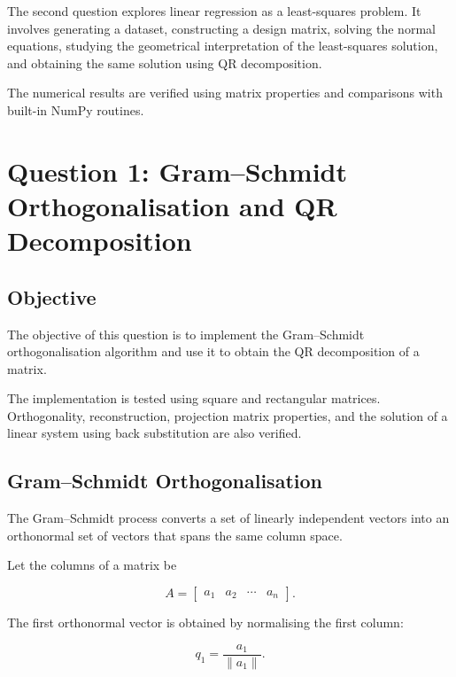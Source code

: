 \documentclass[12pt,a4paper]{article}
\numberwithin{equation}{section}
\begin{document}
The second question explores linear regression as a
least-squares problem. It involves generating a dataset,
constructing a design matrix, solving the normal equations,
studying the geometrical interpretation of the
least-squares solution, and obtaining the same solution
using QR decomposition.

The numerical results are verified using matrix
properties and comparisons with built-in NumPy routines.


\section{Question 1: Gram--Schmidt Orthogonalisation and QR Decomposition}

\subsection{Objective}

The objective of this question is to implement the
Gram--Schmidt orthogonalisation algorithm and use it
to obtain the QR decomposition of a matrix.

The implementation is tested using square and
rectangular matrices. Orthogonality, reconstruction,
projection matrix properties, and the solution of a
linear system using back substitution are also verified.

\subsection{Gram--Schmidt Orthogonalisation}

The Gram--Schmidt process converts a set of linearly
independent vectors into an orthonormal set of vectors
that spans the same column space.

Let the columns of a matrix be

\begin{equation}
A=
\begin{bmatrix}
a_1&a_2&\cdots&a_n
\end{bmatrix}.
\end{equation}

The first orthonormal vector is obtained by normalising
the first column:

\begin{equation}
q_1=\frac{a_1}{\|a_1\|}.
\end{equation}
\end{document}
